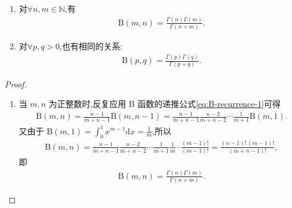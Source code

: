 \documentclass[../../main.tex]{subfiles}%
\begin{document}
\begin{theorem}\label{theorem:Euler积分之间的联系}
\begin{enumerate}[(1)]
\item 对$\forall n,m\in \mathbb{N}$,有
\begin{align*}
\mathrm{B}(m,n) = \frac{\Gamma(n)\Gamma(m)}{\Gamma(n+m)}. 
\end{align*}

\item 对$\forall p,q>0$,也有相同的关系:
\begin{align}
\mathrm{B}(p,q) = \frac{\Gamma(p)\Gamma(q)}{\Gamma(p+q)}. \label{eq:B-Gamma}
\end{align}
\end{enumerate}
\end{theorem}
\begin{proof}
\begin{enumerate}[(1)]
\item 当 $m,n$ 为正整数时,反复应用 B 函数的递推公式\eqref{eq:B-recurrence-1}可得
\begin{align*}
\mathrm{B}(m,n) = \frac{n-1}{m+n-1}\mathrm{B}(m,n-1) = \frac{n-1}{m+n-1}\frac{n-2}{m+n-2}\cdots\frac{1}{m+1}\mathrm{B}(m,1).
\end{align*}
又由于 $\mathrm{B}(m,1) = \int_{0}^{1} x^{m-1}\mathrm{d}x = \frac{1}{m}$,所以
\begin{align*}
\mathrm{B}(m,n) = \frac{n-1}{m+n-1}\frac{n-2}{m+n-2}\cdots\frac{1}{m+1}\frac{1}{m}\cdot\frac{(m-1)!}{(m-1)!} 
= \frac{(n-1)!\,(m-1)!}{(m+n-1)!},
\end{align*}
即
\begin{align}
\mathrm{B}(m,n) = \frac{\Gamma(n)\Gamma(m)}{\Gamma(n+m)}. \label{eq:B-Gamma-int}
\end{align}


\end{enumerate}
\end{proof}
\end{document}
